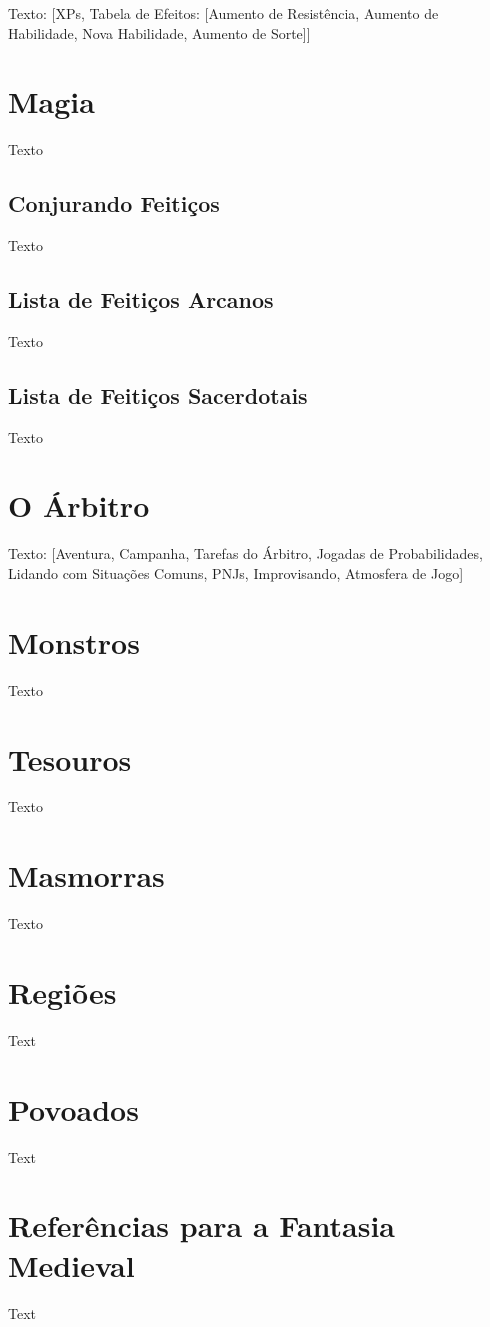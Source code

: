\documentclass[a4paper, twocolumn, 10pt]{book}
\begin{document}
Texto: [XPs, Tabela de Efeitos: [Aumento de Resistência, Aumento de Habilidade, Nova Habilidade, Aumento de Sorte]]

\chapter{Magia}

Texto

\section{Conjurando Feitiços}

Texto

\section{Lista de Feitiços Arcanos}

Texto

\section{Lista de Feitiços Sacerdotais}

Texto

\chapter{O Árbitro}

Texto: [Aventura, Campanha, Tarefas do Árbitro, Jogadas de Probabilidades, Lidando com Situações Comuns, PNJs, Improvisando, Atmosfera de Jogo]

\chapter{Monstros}

Texto

\chapter{Tesouros}

Texto

\appendix

\chapter{Masmorras}

Texto

\chapter{Regiões}

Text

\chapter{Povoados}

Text

\chapter{Referências para a Fantasia Medieval}

Text
\end{document}
